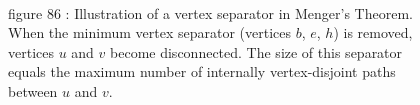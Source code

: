 \documentclass{article}
\theoremstyle{definition}
\begin{document}
\begin{figure}[ht]
\\
\small figure 86 : {Illustration of a vertex separator in Menger's Theorem. When the minimum vertex separator (vertices $b$, $e$, $h$) is removed, vertices $u$ and $v$ become disconnected. The size of this separator equals the maximum number of internally vertex-disjoint paths between $u$ and $v$.}
\label{fig:menger2}
\end{figure}
\end{document}
